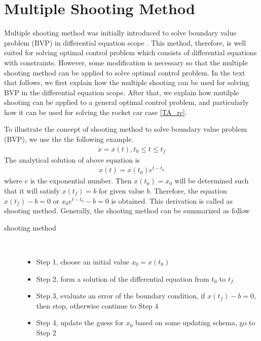 \documentclass  [
  paper    = a4,
  BCOR     = 10mm,
  twoside,
  fontsize = 12pt,
  fleqn,
  toc      = bibnumbered,
  toc      = listofnumbered,
  numbers  = noendperiod,
  headings = normal,
  listof   = leveldown,
  version  = 3.03
]                                       {scrreprt}
\newcommand{\<}{\langle}
\renewcommand{\>}{\rangle}
\begin{document}
   \section{Multiple Shooting Method}
   Multiple shooting method was initially introduced to solve boundary value problem (BVP) in differential equation scope \cite{DJJ62}. This method, therefore, is well suited for solving optimal control problem which consists of differential equations with constraints. However, some modification is necessary so that the multiple shooting method can be applied to solve optimal control problem. In the text that follows, we first explain how the multiple shooting can be used for solving BVP in the differential equation scope. After that, we explain how mutilple shooting can be applied to a general optimal control problem, and particularly how it can be used for solving the rocket car case \ref{TA_rc}.
   
   To illustrate the concept of shooting method to solve boundary value problem (BVP), we use the the following example.
   \begin{align*}
   \dot{x} = x(t), t_0 \leq t \leq t_f	
   \end{align*}
   The analytical solution of above equation is 
   \begin{align*}
   x(t) = x(t_0)e^{t - t_0}
   \end{align*}
   where $e$ is the exponential number. Then $x(t_0) = x_0$ will be determined such that it will satisfy
   $x(t_f)=b$ for given value $b$. Therefore, the equation $x(t_f)-b = 0$ or $x_0e^{t - t_0}-b =0$ is obtained. This derivation is called as shooting method. Generally, the shooting method can be summarized as follow
   \begin{description}
   	\item[shooting method] \
   	\begin{itemize}
   		\item Step 1, choose an initial value $x_0 = x(t_0)$ 
   		\item Step 2, form a solution of the differential equation from $t_0$ to $t_f$
   		\item Step 3, evaluate an error of the boundary condition, if $x(t_f) - b = 0$, then stop, otherwise continue to Step 4 
   		\item Step 4, update the guess for $x_0$ based on some updating schema, go to Step 2
   	\end{itemize}
   \end{description}
   
\end{document}
